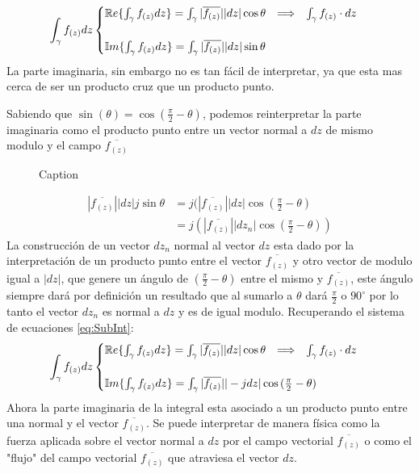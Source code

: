 \begin{equation}
    \int_\gamma f_{(z)}dz
    \begin{cases}
    \mathbb{R}{e}\{\int_\gamma f_{(z)}dz\}= \int_\gamma|\overline{f_{(z)}}||dz|\cos{\theta} \hspace{0.25cm} \Longrightarrow \hspace{0.25cm} \int_\gamma f_{(z)} \cdot dz \\
    \\
    \mathbb{I}{m}\{\int_\gamma f_{(z)}dz\}= \int_\gamma|\overline{f_{(z)}}||dz| \sin{\theta}
    \label{eq:SubInt}
\end{cases}
\end{equation}
La parte imaginaria, sin embargo no es tan fácil de interpretar, ya que esta mas cerca de ser un producto cruz que un producto punto.

Sabiendo que $\sin{(\theta)}=\cos{(\frac{\pi}{2}-\theta)}$, podemos reinterpretar la parte imaginaria como el producto punto entre un vector normal a $dz$ de mismo modulo y el campo $\overline{f_{(z)}}$  
\begin{figure}[H]
    \centering
    
    \caption{Caption}
\end{figure}
\begin{equation}
    \begin{aligned}
         |\overline{f_{(z)}}||dz| j\sin{\theta}&=j(|\overline{f_{(z)}}||dz|\cos{(\frac{\pi}{2}-\theta)}\\
                        &=j(|\overline{f_{(z)}}||dz_n|\cos{(\frac{\pi}{2}-\theta)})
    \end{aligned}
\end{equation}
La construcción de un vector $dz_n$ normal al vector $dz$ esta dado por la interpretación de un producto punto entre el vector $\overline{f_{(z)}}$ y otro vector de modulo igual a $|dz|$, que genere un ángulo de $(\frac{\pi}{2}-\theta)$ entre el mismo y $\overline{f_{(z)}}$, este ángulo siempre dará por definición un resultado que al sumarlo a $\theta$ dará $\frac{\pi}{2}$ o $90^{\circ}$ por lo tanto el vector $dz_n$ es normal a $dz$ y es de igual modulo.
Recuperando el sistema de ecuaciones \ref{eq:SubInt}:
\begin{equation}
    \int_\gamma f_{(z)}dz
    \begin{cases}
    \mathbb{R}{e}\{\int_\gamma f_{(z)}dz\}= \int_\gamma|\overline{f_{(z)}}||dz|\cos{\theta} \hspace{0.25cm} \Longrightarrow \hspace{0.25cm} \int_\gamma f_{(z)} \cdot dz \\
    \\
    \mathbb{I}{m}\{\int_\gamma f_{(z)}dz\}= \int_\gamma|\overline{f_{(z)}}||-jdz|\cos{(\frac{\pi}{2}-\theta)}
\end{cases}
\end{equation}
Ahora la parte imaginaria de la integral esta asociado a un producto punto entre una normal y el vector $\overline{f_{(z)}}$. Se puede interpretar de manera física como la fuerza aplicada sobre el vector normal a $dz$ por el campo vectorial $\overline{f_{(z)}}$ o como el "flujo" del campo vectorial $\overline{f_{(z)}}$ que atraviesa el vector $dz$.

